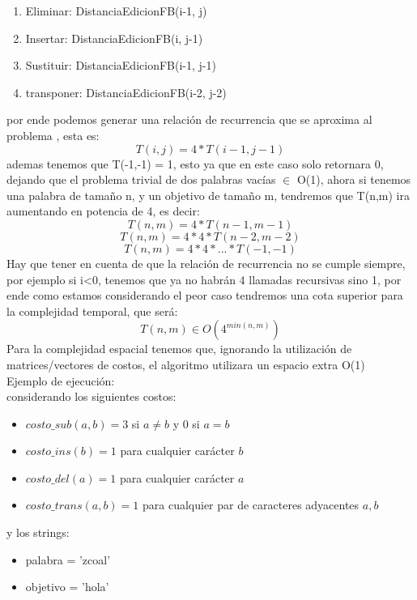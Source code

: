 \begin{enumerate}[1]
    \item Eliminar:  DistanciaEdicionFB(i-1, j)
    \item Insertar:  DistanciaEdicionFB(i, j-1)
    \item Sustituir: DistanciaEdicionFB(i-1, j-1)
    \item transponer: DistanciaEdicionFB(i-2, j-2)
\end{enumerate}

por ende podemos generar una relación de recurrencia que se aproxima al problema , esta es:
\[
    T(i,j) = 4*T(i-1,j-1)
\]
ademas tenemos que T(-1,-1) = 1, esto ya que en este caso solo retornara 0, dejando que el problema trivial de dos palabras vacías $\in $ O(1), ahora si tenemos una palabra de tamaño n, y un objetivo de tamaño m, tendremos que T(n,m) ira aumentando en potencia de 4, es decir:
\[
    T(n,m) = 4*T(n-1,m-1)
\]
\[
    T(n,m) = 4*4*T(n-2,m-2)
\]
\[
    T(n,m) = 4*4*...*T(-1,-1)
\]
Hay que tener en cuenta de que la relación de recurrencia no se cumple siempre, por ejemplo si i<0, tenemos que ya no habrán 4 llamadas recursivas sino 1, por ende como estamos considerando el peor caso tendremos una cota superior para la complejidad temporal, que será:
\[
    T(n,m) \in  O(4^{min(n,m)})
\]
Para la complejidad espacial tenemos que, ignorando la utilización de matrices/vectores de costos, el algoritmo utilizara un espacio extra O(1)\\

Ejemplo de ejecución:\\
considerando los siguientes costos:
\begin{itemize}
    \item $costo\_sub(a,b) = 3$ si $a \neq b$ y $0$ si $a = b$
    \item $costo\_ins(b) = 1$ para cualquier carácter $b$
    \item $costo\_del(a) = 1$ para cualquier carácter $a$
    \item $costo\_trans(a,b) = 1$ para cualquier par de caracteres adyacentes $a, b$
\end{itemize}
y los strings:
\begin{itemize}
    \item palabra = 'zcoal'
    \item objetivo = 'hola'
\end{itemize}

